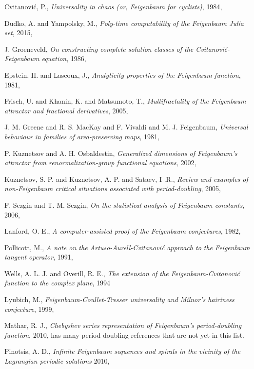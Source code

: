 \begin{description}
{Cvitanovi{\'c}, P.},
{\em Universality in chaos (or, {Feigenbaum} for cyclists)},
{1984},

{Dudko, A. and Yampolsky, M.},
  {\em Poly-time computability of the {Feigenbaum Julia} set},
{2015},

{J. Groeneveld},
{\em On constructing complete solution classes of the {Cvitanovi{\'c}-Feigenbaum} equation},
{1986},

{Epstein, H. and Lascoux, J.},
{\em Analyticity properties of the {Feigenbaum} function},
{1981},

{Frisch, U. and Khanin, K. and Matsumoto, T.},
{\em Multifractality of the {Feigenbaum} attractor and fractional derivatives},
{2005},

{J. M. Greene and R. S. MacKay and F. Vivaldi and M. J. Feigenbaum},
{\em Universal behaviour in families of area-preserving maps},
{1981},

{P. Kuznetsov and A. H. Osbaldestin},
{\em Generalized dimensions of {Feigenbaum}'s attractor from renormalization-group functional equations},
{2002},

{Kuznetsov, S. P. and Kuznetsov, A. P. and Sataev, I .R.},
{\em Review and examples of non-{Feigenbaum} critical situations associated with period-doubling},
{2005},

{F. Sezgin and T. M. Sezgin},
{\em On the statistical analysis of {Feigenbaum} constants},
{2006},

{{Lanford}, O. E.},
{\em A computer-assisted proof of the {Feigenbaum} conjectures},
{1982},

{Pollicott, M.},
{\em A note on the {Artuso-Aurell-Cvitanovi{\'c}} approach to the {Feigenbaum} tangent operator},
{1991},

{Wells, A. L. J. and Overill, R. E.},
{\em The extension of the {Feigenbaum-Cvitanovi{\'c}} function to the complex plane},
{1994}

{Lyubich, M.},
{\em {Feigenbaum-Coullet-Tresser} universality and {Milnor}'s hairiness conjecture},
{1999},

{Mathar, R. J.},
{\em {Chebyshev} series representation of {Feigenbaum's} period-doubling function},
{2010}, has many period-doubling references that are not yet in this list.

{Pinotsis, A. D.},
{\em Infinite {Feigenbaum} sequences and spirals in the vicinity of the
{Lagrangian} periodic solutions}
{2010},


\end{description}
